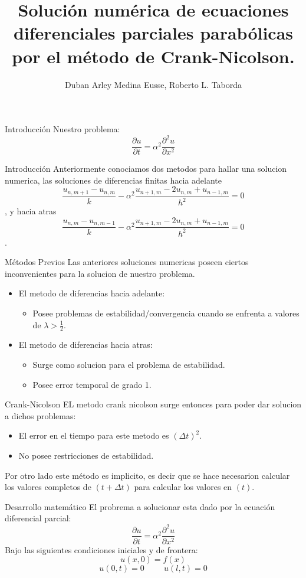 \documentclass{beamer}
\title{Solución numérica de ecuaciones diferenciales parciales parabólicas por el método de Crank-Nicolson.}
\author{Duban Arley Medina Eusse, Roberto L. Taborda}
\begin{document}
\begin{frame}
	\titlepage
\end{frame}

\begin{frame}{Introducción}
	Nuestro problema:
	$$\frac{\partial u}{\partial t}=\alpha^2\frac{\partial^2 u}{\partial x^2}$$
\end{frame}
\begin{frame}{Introducción}
Anteriormente conociamos dos metodos para hallar una solucion numerica, las soluciones de diferencias finitas hacia adelante $$\frac{u_{n,m+1}-u_{n,m}}{k}-\alpha^2\frac{u_{n+1,m}-2u_{n,m}+u_{n-1,m}}{h^2}=0$$, y hacia atras $$\frac{u_{n,m}-u_{n,m-1}}{k}-\alpha^2\frac{u_{n+1,m}-2u_{n,m}+u_{n-1,m}}{h^2}=0$$.
\end{frame}
\begin{frame}{Métodos Previos}
Las anteriores soluciones numericas poseen ciertos inconvenientes para la solucion de nuestro problema.
\begin{itemize}
\item El metodo de diferencias hacia adelante:
\begin{itemize}
 	\item Posee problemas de estabilidad/convergencia cuando se enfrenta a valores de $\lambda > \frac{1}{2}$.
\end{itemize}
\item El metodo de diferencias hacia atras:
\begin{itemize}
\item Surge como solucion para el problema de estabilidad.
\item Posee error temporal de grado 1.
\end{itemize}
\end{itemize}
\end{frame}
\begin{frame}{Crank-Nicolson}
EL metodo crank nicolson surge entonces para poder dar solucion a dichos problemas:
\begin{itemize}
	\item El error en el tiempo para este metodo es $(\varDelta t)^2$.
	\item No posee restricciones de estabilidad.
\end{itemize}
Por otro lado este método es implicito, es decir que se hace necesarion calcular los valores completos de $(t+\varDelta t)$ para calcular los valores en $(t)$.
\end{frame}
\begin{frame}{Desarrollo matemático}
El probrema a solucionar esta dado por la ecuación diferencial parcial:
$$\frac{\partial u}{\partial t}=\alpha^2\frac{\partial^2 u}{\partial x^2}$$
Bajo las siguientes condiciones iniciales y de frontera:
$$u(x,0)=f(x)$$
$$u(0,t)=0\hspace{1cm}u(l,t)=0$$
\end{frame}
\end{document}
